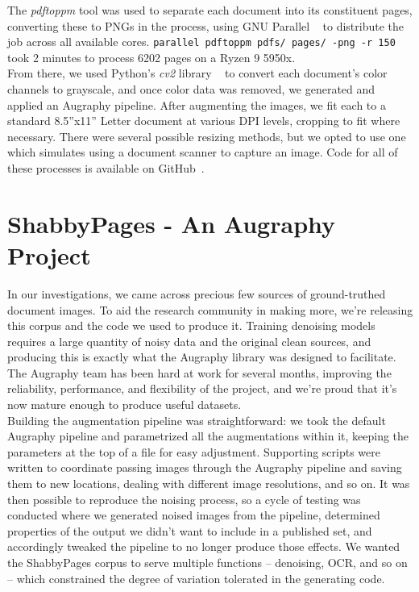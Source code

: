 \documentclass[runningheads]{llncs}
\begin{document}
The \textit{pdftoppm} tool was used to separate each document into its constituent pages, converting these to PNGs in the process, using GNU Parallel ~\cite{ref_parallel} to distribute the job across all available cores. \texttt{parallel pdftoppm pdfs/{} pages/{} -png -r 150} took 2 minutes to process 6202 pages on a Ryzen 9 5950x.\\

From there, we used Python's \textit{cv2} library ~\cite{ref_url3} to convert each document's color channels to grayscale, and once color data was removed, we generated and applied an Augraphy pipeline. After augmenting the images, we fit each to a standard 8.5''x11'' Letter document at various DPI levels, cropping to fit where necessary. There were several possible resizing methods, but we opted to use one which simulates using a document scanner to capture an image.  Code for all of these processes is available on GitHub~\cite{ref_shabby}.

\section{ShabbyPages - An Augraphy Project}
In our investigations, we came across precious few sources of ground-truthed document images. To aid the research community in making more, we're releasing this corpus and the code we used to produce it. Training denoising models requires a large quantity of noisy data and the original clean sources, and producing this is exactly what the Augraphy library was designed to facilitate. The Augraphy team has been hard at work for several months, improving the reliability, performance, and flexibility of the project, and we're proud that it's now mature enough to produce useful datasets.\\

Building the augmentation pipeline was straightforward: we took the default Augraphy pipeline and parametrized all the augmentations within it, keeping the parameters at the top of a file for easy adjustment. Supporting scripts were written to coordinate passing images through the Augraphy pipeline and saving them to new locations, dealing with different image resolutions, and so on. It was then possible to reproduce the noising process, so a cycle of testing was conducted where we generated noised images from the pipeline, determined properties of the output we didn't want to include in a published set, and accordingly tweaked the pipeline to no longer produce those effects. We wanted the ShabbyPages corpus to serve multiple functions -- denoising, OCR, and so on -- which constrained the degree of variation tolerated in the generating code.\\
\end{document}
